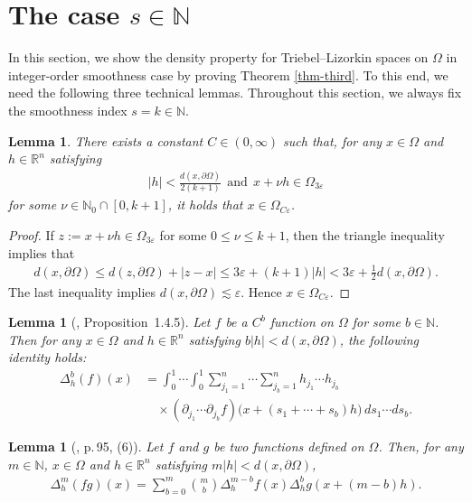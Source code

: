 \documentclass[11pt,twoside]{article}
\def\rn{{\mathbb{R}^n}}
\def\nn{{\mathbb N}}
\def\boz{{\Omega}}
\def\vez{\varepsilon}
\def\pa{\partial}                %
\theoremstyle{mylem}
\newtheorem{lemma}[theorem]{Lemma}
\theoremstyle{definition}
\numberwithin{equation}{section}
\begin{document}
\section{The case $s\in\mathbb{N}$}\label{sN}

In this section, we show the density property for Triebel--Lizorkin 
spaces on $\boz$ in integer-order smoothness 
case by proving Theorem \ref{thm-third}. To this end,
we need the following three technical lemmas.
Throughout this section, we always fix the smoothness index
$s=k\in\mathbb{N}$.

\begin{lemma}\label{lembls}
There exists a constant $C\in(0,\infty)$ such that,
for any $x\in\boz$ and $h\in\mathbb{R}^n$ satisfying
\begin{align*}
|h|<\frac{d(x,\pa\boz)}{2(k+1)}
\ \ \text{and}\ \ 
x+\nu h\in\Omega_{3\varepsilon}
\end{align*}
for some $\nu\in\mathbb{N}_0\cap[0,k+1]$,
it holds that $x\in\Omega_{C\varepsilon}$.
\end{lemma}

\begin{proof}
If $z:=x+\nu h\in\boz_{3\vez}$ for some $0\le\nu\le k+1$, then
the triangle inequality implies that
\begin{align*}
d(x,\pa\boz)
\leq d(z,\pa\boz)+|z-x|
\leq 3\vez+(k+1)|h|
< 3\vez+\frac{1}{2} d(x,\pa\boz).
\end{align*}
The last inequality implies $d(x,\pa\boz)\lesssim\vez$. Hence $x\in\boz_{C\vez}$.
\end{proof}

\begin{lemma}[\cite{g2014}, Proposition~1.4.5]\label{lemdwc}
Let $f$ be a ${C}^b$ function on $\boz$ for some $b\in\nn$. Then for any $x\in\boz$ and $h\in\rn$ satisfying $b|h|<d(x,\pa\boz)$, the following identity holds:
\begin{align*}
\Delta_h^{b}(f)(x)&=
\int_{0}^{1} \cdots \int_{0}^{1} \sum_{j_1=1}^{n} \cdots \sum_{j_b=1}^{n} h_{j_1} \cdots h_{j_b} \\
&\quad \times \left(\partial_{j_1} \cdots \partial_{j_b} f\right)\big(x+(s_1+\cdots+s_b)h\big)
\,ds_1\cdots ds_b.
\end{align*}
\end{lemma}

\begin{lemma}[\cite{j1965}, p.\,95, (6)]\label{lemdlf}
Let $f$ and $g$ be two functions defined on $\boz$. Then, for any $m\in\nn$, $x\in\boz$ and $h\in\rn$ satisfying $m|h|<d(x,\pa\boz)$,
\begin{align*}
\Delta_h^m(fg)(x)
=\sum_{b=0}^m \binom{m}{b}
\Delta_h^{m-b}f(x)
\Delta_h^b g\left(x+(m-b)h\right).
\end{align*}
\end{lemma}
\end{document}
